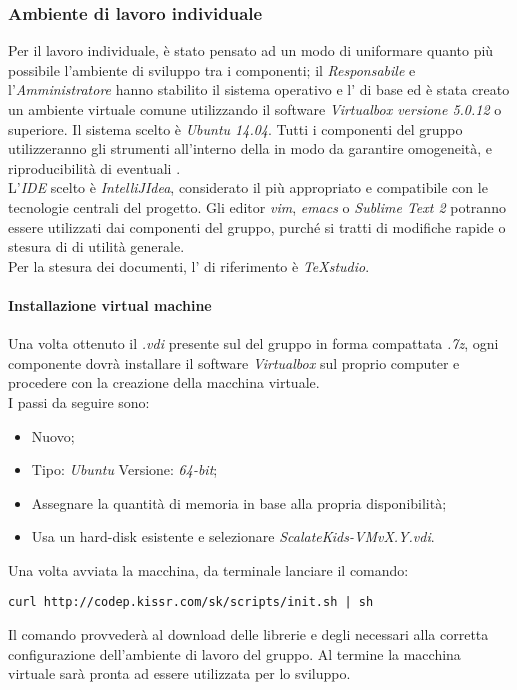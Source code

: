 \documentclass{scalatekids-article}
\begin{document}
\subsubsection{Ambiente di lavoro individuale}

Per il lavoro individuale, è stato pensato ad un modo di uniformare quanto più
possibile l'ambiente di sviluppo tra i componenti; il \textit{Responsabile} e
l'\textit{Amministratore} hanno stabilito il sistema operativo e l' di base ed è stata creato
un ambiente virtuale comune utilizzando il software \textit{Virtualbox versione 5.0.12} o superiore. Il sistema scelto è \textit{Ubuntu 14.04}.
Tutti i componenti del gruppo utilizzeranno gli strumenti all'interno della
 in modo da garantire omogeneità, e riproducibilità di
eventuali .\\ L'\textit{IDE} scelto è \textit{IntelliJIdea}, considerato il
più appropriato e compatibile con le tecnologie centrali del progetto. Gli
editor \textit{vim}, \textit{emacs} o \textit{Sublime Text 2} potranno essere
utilizzati dai componenti del gruppo, purché si tratti di modifiche rapide o
stesura di  di utilità generale.\\
Per la stesura dei documenti, l' di riferimento è \textit{TeXstudio}.

\paragraph{Installazione virtual machine}

\label{sec:MacchinaVirtuale}
Una volta ottenuto il  \textit{.vdi} presente sul  del gruppo
in forma compattata \textit{.7z}, ogni componente dovrà installare il software
\textit{Virtualbox} sul proprio computer e procedere con la creazione della
macchina virtuale.\\
I passi da seguire sono:
\begin{itemize}
    \item Nuovo;
    \item Tipo: \textit{Ubuntu} Versione: \textit{64-bit};
    \item Assegnare la quantità di memoria in base alla propria disponibilità;
    \item Usa un hard-disk esistente e selezionare \textit{ScalateKids-VMvX.Y.vdi}.
\end{itemize}
Una volta avviata la macchina, da terminale lanciare il comando:
\begin{center}
    \verb=curl http://codep.kissr.com/sk/scripts/init.sh | sh=
\end{center}
Il comando provvederà al download delle librerie e degli 
necessari alla corretta configurazione dell'ambiente di lavoro del gruppo.
Al termine la macchina virtuale sarà pronta ad essere utilizzata per lo sviluppo.
\end{document}
